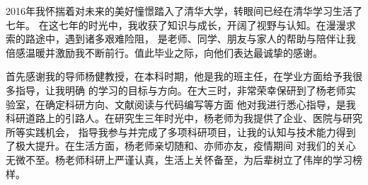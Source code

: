 
\begin{acknowledgements}
2016年我怀揣着对未来的美好憧憬踏入了清华大学，转眼间已经在清华学习生活了七年。
在这七年的时光中，我收获了知识与成长，开阔了视野与认知。在漫漫求索的路途中，遇到诸多艰难险阻，
是老师、同学、朋友与家人的帮助与陪伴让我倍感温暖并激励我不断前行。值此毕业之际，向他们表达最诚挚的感谢。

首先感谢我的导师杨健教授，在本科时期，他是我的班主任，在学业方面给予我很多指导，让我明确
的学习的目标与方向。在大三时，非常荣幸保研到了杨老师实验室，在确定科研方向、文献阅读与代码编写等方面
他对我进行悉心指导，是我科研道路上的引路人。在研究生三年时光中，杨老师为我提供了企业、医院与研究所等实践机会，
指导我参与并完成了多项科研项目，让我的认知与技术能力得到了极大提升。在生活方面，杨老师亲切随和、亦师亦友，疫情期间
对我们的关心无微不至。杨老师科研上严谨认真，生活上关怀备至，为后辈树立了伟岸的学习榜样。


\end{acknowledgements}
